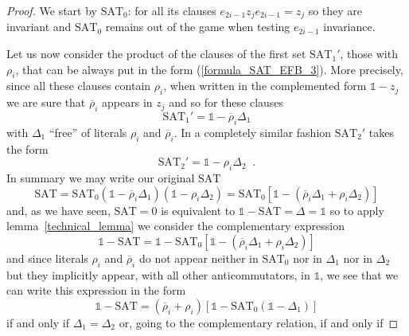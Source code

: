 \documentclass[a4paper,twoside,11pt]{article}
\begin{document}
{\begin{proof}
We start by ${\ensuremath{\mbox{SAT}}}_0$: for all its clauses ${e}_{2 i - 1} z_j {e}_{2 i - 1} = z_j$ so they are invariant and ${\ensuremath{\mbox{SAT}}}_0$ remains out of the game when testing ${e}_{2 i - 1}$ invariance.

Let us now consider the product of the clauses of the first set ${\ensuremath{\mbox{SAT}}}_1'$, those with ${\ensuremath{\rho}}_i$, that can be always put in the form (\ref{formula_SAT_EFB_3}). More precisely, since all these clauses contain ${\ensuremath{\rho}}_i$, when written in the complemented form ${\ensuremath{\mathbb{1}}} - z_j$ we are sure that ${\overline{\ensuremath{\rho}}}_i$ appears in $z_j$ and so for these clauses
$$
{\ensuremath{\mbox{SAT}}}_1' = {\ensuremath{\mathbb{1}}} - {\overline{\ensuremath{\rho}}}_i \Delta_1
$$
with $\Delta_1$ ``free'' of literals ${\ensuremath{\rho}}_i$ and ${\overline{\ensuremath{\rho}}}_i$. In a completely similar fashion ${\ensuremath{\mbox{SAT}}}_2'$ takes the form
$$
{\ensuremath{\mbox{SAT}}}_2' = {\ensuremath{\mathbb{1}}} - {\ensuremath{\rho}}_i \Delta_2 {\;\; \mathrm{.}}
$$
In summary we may write our original {\ensuremath{\mbox{SAT}}}{}
$$
{\ensuremath{\mbox{SAT}}} = {\ensuremath{\mbox{SAT}}}_0 ({\ensuremath{\mathbb{1}}} - {\overline{\ensuremath{\rho}}}_i \Delta_1) ({\ensuremath{\mathbb{1}}} - {\ensuremath{\rho}}_i \Delta_2) = {\ensuremath{\mbox{SAT}}}_0 \left[{\ensuremath{\mathbb{1}}} - ({\overline{\ensuremath{\rho}}}_i \Delta_1 + {\ensuremath{\rho}}_i \Delta_2)\right]
$$
and, as we have seen, ${\ensuremath{\mbox{SAT}}} = 0$ is equivalent to ${\ensuremath{\mathbb{1}}} - {\ensuremath{\mbox{SAT}}} = \Delta = {\ensuremath{\mathbb{1}}}$ so to apply lemma~\ref{technical_lemma} we consider the complementary expression
$$
{\ensuremath{\mathbb{1}}} - {\ensuremath{\mbox{SAT}}} = {\ensuremath{\mathbb{1}}} - {\ensuremath{\mbox{SAT}}}_0 \left[{\ensuremath{\mathbb{1}}} - ({\overline{\ensuremath{\rho}}}_i \Delta_1 + {\ensuremath{\rho}}_i \Delta_2)\right]
$$
and since literals ${\ensuremath{\rho}}_i$ and ${\overline{\ensuremath{\rho}}}_i$ do not appear neither in ${\ensuremath{\mbox{SAT}}}_0$ nor in $\Delta_1$ nor in $\Delta_2$ but they implicitly appear, with all other anticommutators, in ${\ensuremath{\mathbb{1}}}$, we see that we can write this expression in the form
$$
{\ensuremath{\mathbb{1}}} - {\ensuremath{\mbox{SAT}}} = ({\overline{\ensuremath{\rho}}}_i + {\ensuremath{\rho}}_i) \left[{\ensuremath{\mathbb{1}}} - {\ensuremath{\mbox{SAT}}}_0 ({\ensuremath{\mathbb{1}}} - \Delta_1)\right]
$$
if and only if $\Delta_1 = \Delta_2$ or, going to the complementary relation, if and only if

\end{proof}}
\end{document}
